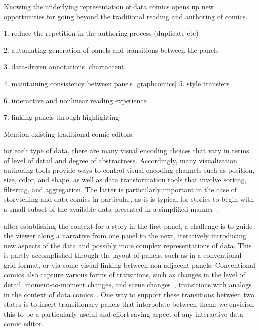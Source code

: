 
Knowing the underlying representation of data comics opens up new opportunities for going beyond the traditional reading and authoring of comics. 


1. reduce the repetition in the authoring process (duplicate etc)

2. automating generation of panels and transitions between the panels

3. data-driven annotations [chartaccent]

4. maintaining consistency between panels [graphcomics] 
5. style transfers

6. interactive and nonlinear reading experience

7. linking panels through highlighting

Mention existing traditional comic editors:


for each type of data, there are many visual encoding choices that vary in terms of level of detail and degree of abstractness. 
Accordingly, many visualization authoring tools provide ways to control visual encoding channels such as position, size, color, and shape, as well as data transformation tools that involve sorting, filtering, and aggregation. 
The latter is particularly important in the case of storytelling and data comics in particular, as it is typical for stories to begin with a small subset of the available data presented in a simplified manner~\cite{segel2010narrative}. 

after establishing the context for a story in the first panel, a challenge is to guide the viewer along a narrative from one panel to the next, iteratively introducing new aspects of the data and possibly more complex representations of data.
This is partly accomplished through the layout of panels, such as in a conventional grid format, or via some visual linking between non-adjacent panels.
Conventional comics also capture various forms of transitions, such as changes in the level of detail, moment-to-moment changes, and scene changes~\cite{mccloud1993understanding}, transitions with analogs in the context of data comics~\cite{bach2017emerging}. 
One way to support these transitions between two states is to insert transitionary panels that interpolate between them; we envision this to be a particularly useful and effort-saving aspect of any interactive data comic editor.

